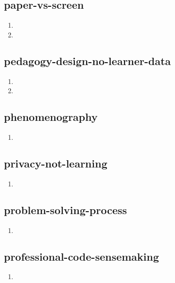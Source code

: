 \documentclass{article}
\begin{document}
\subsection{paper-vs-screen}
\begin{enumerate}
\item {}
\item {}
\end{enumerate}

\subsection{pedagogy-design-no-learner-data}
\begin{enumerate}
\item {}
\item {}
\end{enumerate}

\subsection{phenomenography}
\begin{enumerate}
\item {}
\end{enumerate}

\subsection{privacy-not-learning}
\begin{enumerate}
\item {}
\end{enumerate}

\subsection{problem-solving-process}
\begin{enumerate}
\item {}
\end{enumerate}

\subsection{professional-code-sensemaking}
\begin{enumerate}
\item {}
\end{enumerate}
\end{document}
